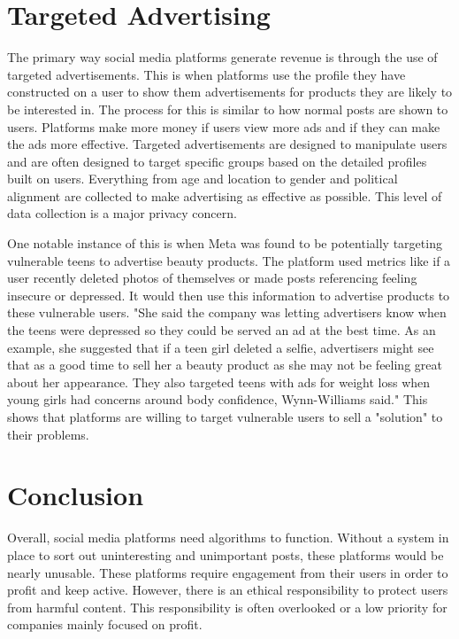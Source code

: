 \documentclass[conference]{IEEEtran}
\begin{document}
\section{Targeted Advertising}
The primary way social media platforms generate revenue is through the use of targeted advertisements. This is when platforms use the profile they have constructed on a user to show them advertisements for products they are likely to be interested in. The process for this is similar to how normal posts are shown to users. Platforms make more money if users view more ads and if they can make the ads more effective. Targeted advertisements are designed to manipulate users and are often designed to target specific groups based on the detailed profiles built on users. Everything from age and location to gender and political alignment are collected to make advertising as effective as possible. This level of data collection is a major privacy concern.

One notable instance of this is when Meta was found to be potentially targeting vulnerable teens to advertise beauty products. The platform used metrics like if a user recently deleted photos of themselves or made posts referencing feeling insecure or depressed. It would then use this information to advertise products to these vulnerable users. "She said the company was letting advertisers know when the teens were depressed so they could be served an ad at the best time. As an example, she suggested that if a teen girl deleted a selfie, advertisers might see that as a good time to sell her a beauty product as she may not be feeling great about her appearance. They also targeted teens with ads for weight loss when young girls had concerns around body confidence, Wynn-Williams said."\cite{Bellens2025_MetaAdsTeens} This shows that platforms are willing to target vulnerable users to sell a "solution" to their problems.

\section*{Conclusion}
Overall, social media platforms need algorithms to function. Without a system in place to sort out uninteresting and unimportant posts, these platforms would be nearly unusable. These platforms require engagement from their users in order to profit and keep active. However, there is an ethical responsibility to protect users from harmful content. This responsibility is often overlooked or a low priority for companies mainly focused on profit.
\end{document}
